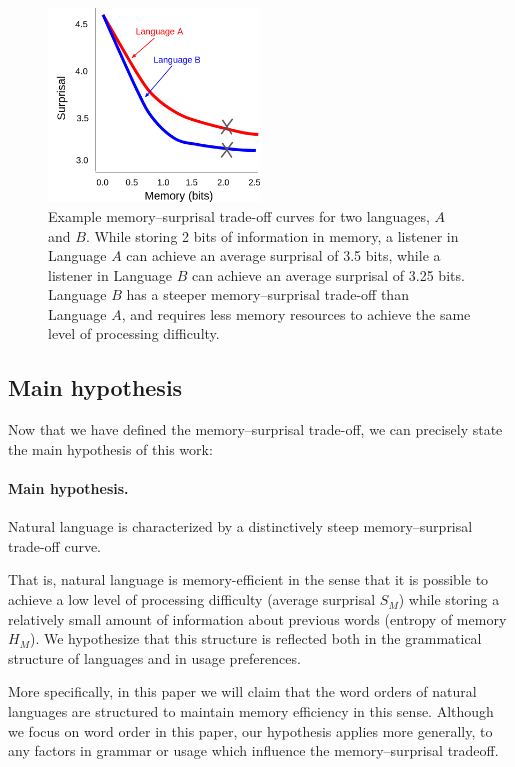 \begin{figure}
\centering
\includegraphics[width=0.5\textwidth]{figures-gdrive/tradeoff.png}
\caption{Example memory--surprisal trade-off curves for two languages, $A$ and $B$. While storing 2 bits of information in memory, a listener in Language $A$ can achieve an average surprisal of 3.5 bits, while a listener in Language $B$ can achieve an average surprisal of 3.25 bits. Language $B$ has a steeper memory--surprisal trade-off than Language $A$, and requires less memory resources to achieve the same level of processing difficulty.}
\label{fig:examples}
\end{figure}

\subsection{Main hypothesis}

Now that we have defined the memory--surprisal trade-off, we can precisely state the main hypothesis of this work:
\paragraph{Main hypothesis.}  Natural language is characterized by a distinctively steep memory--surprisal trade-off curve.

That is, natural language is memory-efficient in the sense that it is possible to achieve a low level of processing difficulty (average surprisal $S_M$) while storing a relatively small amount of information about previous words (entropy of memory $H_M$). We hypothesize that this structure is reflected both in the grammatical structure of languages and in usage preferences.

More specifically, in this paper we will claim that the word orders of natural languages are structured to maintain memory efficiency in this sense. Although we focus on word order in this paper, our hypothesis applies more generally, to any factors in grammar or usage which influence the memory--surprisal tradeoff.

